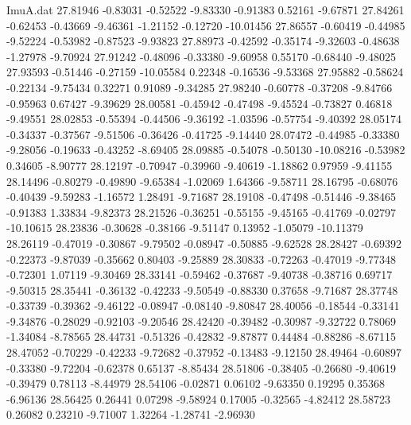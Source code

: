 \begin{filecontents}{ImuA.dat}
  27.81946   -0.83031   -0.52522   -9.83330   -0.91383    0.52161   -9.67871
  27.84261   -0.62453   -0.43669   -9.46361   -1.21152   -0.12720  -10.01456
  27.86557   -0.60419   -0.44985   -9.52224   -0.53982   -0.87523   -9.93823
  27.88973   -0.42592   -0.35174   -9.32603   -0.48638   -1.27978   -9.70924
  27.91242   -0.48096   -0.33380   -9.60958    0.55170   -0.68440   -9.48025
  27.93593   -0.51446   -0.27159  -10.05584    0.22348   -0.16536   -9.53368
  27.95882   -0.58624   -0.22134   -9.75434    0.32271    0.91089   -9.34285
  27.98240   -0.60778   -0.37208   -9.84766   -0.95963    0.67427   -9.39629
  28.00581   -0.45942   -0.47498   -9.45524   -0.73827    0.46818   -9.49551
  28.02853   -0.55394   -0.44506   -9.36192   -1.03596   -0.57754   -9.40392
  28.05174   -0.34337   -0.37567   -9.51506   -0.36426   -0.41725   -9.14440
  28.07472   -0.44985   -0.33380   -9.28056   -0.19633   -0.43252   -8.69405
  28.09885   -0.54078   -0.50130  -10.08216   -0.53982    0.34605   -8.90777
  28.12197   -0.70947   -0.39960   -9.40619   -1.18862    0.97959   -9.41155
  28.14496   -0.80279   -0.49890   -9.65384   -1.02069    1.64366   -9.58711
  28.16795   -0.68076   -0.40439   -9.59283   -1.16572    1.28491   -9.71687
  28.19108   -0.47498   -0.51446   -9.38465   -0.91383    1.33834   -9.82373
  28.21526   -0.36251   -0.55155   -9.45165   -0.41769   -0.02797  -10.10615
  28.23836   -0.30628   -0.38166   -9.51147    0.13952   -1.05079  -10.11379
  28.26119   -0.47019   -0.30867   -9.79502   -0.08947   -0.50885   -9.62528
  28.28427   -0.69392   -0.22373   -9.87039   -0.35662    0.80403   -9.25889
  28.30833   -0.72263   -0.47019   -9.77348   -0.72301    1.07119   -9.30469
  28.33141   -0.59462   -0.37687   -9.40738   -0.38716    0.69717   -9.50315
  28.35441   -0.36132   -0.42233   -9.50549   -0.88330    0.37658   -9.71687
  28.37748   -0.33739   -0.39362   -9.46122   -0.08947   -0.08140   -9.80847
  28.40056   -0.18544   -0.33141   -9.34876   -0.28029   -0.92103   -9.20546
  28.42420   -0.39482   -0.30987   -9.32722    0.78069   -1.34084   -8.78565
  28.44731   -0.51326   -0.42832   -9.87877    0.44484   -0.88286   -8.67115
  28.47052   -0.70229   -0.42233   -9.72682   -0.37952   -0.13483   -9.12150
  28.49464   -0.60897   -0.33380   -9.72204   -0.62378    0.65137   -8.85434
  28.51806   -0.38405   -0.26680   -9.40619   -0.39479    0.78113   -8.44979
  28.54106   -0.02871    0.06102   -9.63350    0.19295    0.35368   -6.96136
  28.56425    0.26441    0.07298   -9.58924    0.17005   -0.32565   -4.82412
  28.58723    0.26082    0.23210   -9.71007    1.32264   -1.28741   -2.96930

\end{filecontents}
